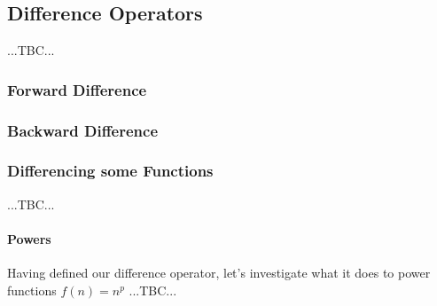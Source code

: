 
\subsection{Difference Operators}  ...TBC...


\subsubsection{Forward Difference}



\subsubsection{Backward Difference}






\subsubsection{Differencing some Functions} ...TBC...

\paragraph{Powers}
Having defined our difference operator, let's investigate what it does to power functions $f(n) = n^p$ ...TBC...


